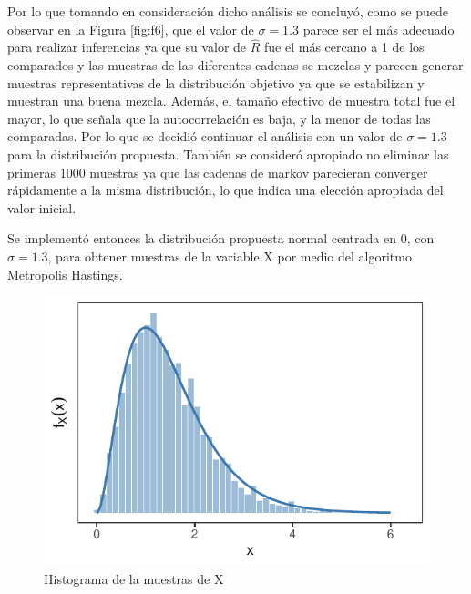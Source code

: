 \documentclass[
]{article}
\begin{document}
Por lo que tomando en consideración dicho análisis se concluyó, como se puede observar en la Figura \ref{fig:f6}, que el valor de \(\sigma = 1.3\) parece ser el más adecuado para realizar inferencias ya que su valor de \(\hat{R}\) fue el más cercano a 1 de los comparados y las muestras de las diferentes cadenas se mezclas y parecen generar muestras representativas de la distribución objetivo ya que se estabilizan y muestran una buena mezcla. Además, el tamaño efectivo de muestra total fue el mayor, lo que señala que la autocorrelación es baja, y la menor de todas las comparadas. Por lo que se decidió continuar el análisis con un valor de \(\sigma = 1.3\) para la distribución propuesta. También se consideró apropiado no eliminar las primeras 1000 muestras ya que las cadenas de markov parecieran converger rápidamente a la misma distribución, lo que indica una elección apropiada del valor inicial.

Se implementó entonces la distribución propuesta normal centrada en 0, con \(\sigma = 1.3\), para obtener muestras de la variable X por medio del algoritmo Metropolis Hastings.

\begin{figure}

{\centering \includegraphics{TP-2---El-Dibu-de-la-vida_files/figure-latex/f7-1} 

}

\caption{Histograma de la muestras de X}\label{fig:f7}
\end{figure}
\end{document}
